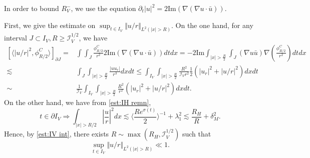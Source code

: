 \documentclass[reqno, 11pt]{amsart}
\numberwithin{equation}{section}
\theoremstyle{plain}
\theoremstyle{definition}
\numberwithin{equation}{section}
\numberwithin{theorem}{section}
\numberwithin{equation}{section}
\renewcommand{\Im}{\mathrm{Im}}
\numberwithin{equation}{section}
\numberwithin{theorem}{section}
\begin{document}
	In order to bound $R_{V}^{-}$, we use the equation $\partial_{t}|u|^2=2\Im\left( \nabla\left(\nabla u\cdot \bar{u}\right) \right)$.
	
	First, we give the estimate on $\sup_{t\in I_V} \Vert u/r \Vert_{L^2(|x|>R)}$. On the one hand, for any interval $J\subset I_V, R\geq \mathcal{I}_V^{1/2}$, we have
	\begin{equation}\label{est:decay var}
	\begin{aligned}
	[\langle |u/r|^2,\phi_{R/2}^{C} \rangle]_{\partial J}=&\int\int_{J}\frac{\phi_{R/2}^{C}}{r^2} 2\Im\left( \nabla\left(\nabla u\cdot \bar{u}\right) \right)dtdx= -2\Im\int_{|x|>\frac{R}{2}}\int_{J}\left(\nabla u\bar{u}\right)\nabla\left( \frac{\phi_{R/2}^{C}}{r^2} \right)dtdx \\ \lesssim& \int_{J} \int_{|x|>\frac{R}{2}} \frac{|uu_{r}|}{r^3} dxdt \leq \int_{I_V}\int_{|x|>\frac{R}{2}}\frac{R^2}{\mathcal{I}_V r^2} \frac{1}{2}\left( |u_r|^2+|u/r|^2 \right)dxdt\\ \sim& \frac{1}{\mathcal{I}_V}\int_{I_V}\int_{|x|>\frac{R}{2}} \frac{R^2}{r^2}\left( |u_r|^2+|u/r|^2 \right) dxdt .
	\end{aligned}
	\end{equation}
	On the other hand, we have from \eqref{est:IH remn},
	\begin{equation*}
	t\in \partial I_V \Longrightarrow \int_{|x|>R/2} |\frac{u}{r}|^2 dx\lesssim \langle \frac{Re^{\sigma(t)}}{2}\rangle^{-1}+\lambda_{1}^2 \lesssim \frac{R_H}{R}+\delta_{M}^2.
	\end{equation*}
	Hence, by \eqref{est:IV int}, there exists $R\sim \max(R_H,\mathcal{I}_V^{1/2})$ such that
	\begin{equation}\label{ext u/r small}
	\sup_{t\in I_V} \Vert u/r \Vert_{L^2(|x|>R)} \ll 1.
	\end{equation}
	
\end{document}

